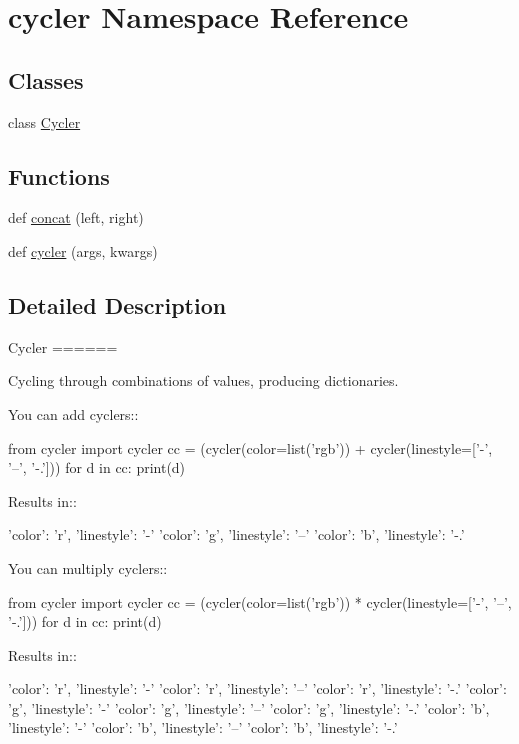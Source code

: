 \hypertarget{namespacecycler}{}\section{cycler Namespace Reference}
\label{namespacecycler}
\subsection*{Classes}
\begin{DoxyCompactItemize}
\item 
class \hyperlink{classcycler_1_1Cycler}{Cycler}
\end{DoxyCompactItemize}
\subsection*{Functions}
\begin{DoxyCompactItemize}
\item 
def \hyperlink{namespacecycler_ad5661339f84cea158df28b2b2064e045}{concat} (left, right)
\item 
def \hyperlink{namespacecycler_a52e235843070faa367f50dd1159a7afd}{cycler} (args, kwargs)
\end{DoxyCompactItemize}


\subsection{Detailed Description}
\begin{DoxyVerb}Cycler
======

Cycling through combinations of values, producing dictionaries.

You can add cyclers::

    from cycler import cycler
    cc = (cycler(color=list('rgb')) +
          cycler(linestyle=['-', '--', '-.']))
    for d in cc:
        print(d)

Results in::

    {'color': 'r', 'linestyle': '-'}
    {'color': 'g', 'linestyle': '--'}
    {'color': 'b', 'linestyle': '-.'}


You can multiply cyclers::

    from cycler import cycler
    cc = (cycler(color=list('rgb')) *
          cycler(linestyle=['-', '--', '-.']))
    for d in cc:
        print(d)

Results in::

    {'color': 'r', 'linestyle': '-'}
    {'color': 'r', 'linestyle': '--'}
    {'color': 'r', 'linestyle': '-.'}
    {'color': 'g', 'linestyle': '-'}
    {'color': 'g', 'linestyle': '--'}
    {'color': 'g', 'linestyle': '-.'}
    {'color': 'b', 'linestyle': '-'}
    {'color': 'b', 'linestyle': '--'}
    {'color': 'b', 'linestyle': '-.'}
\end{DoxyVerb}
 

